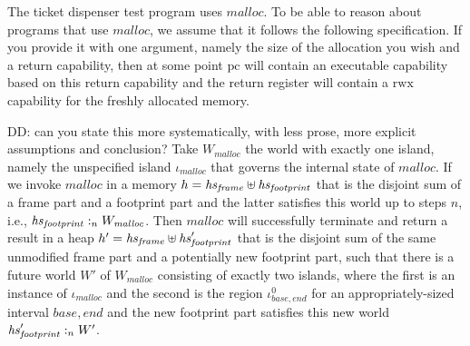 \documentclass{article}
\newcommand\lau[1]{{\color{purple} \sf \footnotesize {LS: #1}}}
\newcommand\dominique[1]{{\color{purple} \sf \footnotesize {DD: #1}}}
\newcommand{\var}[1]{\mathit{#1}}
\newcommand{\pcreg}{\mathrm{pc}}
\newcommand{\heap}{\var{heap}}
\newcommand{\heapSat}[3][\heap]{#1 :_{#2} #3}
\newcommand{\codelabel}[1]{\mathit{#1}}
\newcommand{\malloc}{\codelabel{malloc}}
\newcommand{\plainperm}[1]{\mathrm{#1}}
\newcommand{\rwx}{\plainperm{rwx}}
\begin{document}
The ticket dispenser test program uses $\malloc$. To be able to reason about programs that use $\malloc$, we assume that it follows the following specification. If you provide it with one argument, namely the size of the allocation you wish and a return capability, then at some point $\pcreg$ will contain an executable capability based on this return capability and the return register will contain a $\rwx$ capability for the freshly allocated memory. 
\begin{specification}[Malloc]\dominique{can you state this more systematically, with less prose, more explicit assumptions and conclusion?}
Take $W_{\malloc}$ the world with exactly one island, namely the unspecified island $\iota_{\malloc}$ that governs the internal state of $\malloc$.  If we invoke $\malloc$ in a memory $h = \hsframe \uplus \hsfoot$
that is the disjoint sum of a frame part and a footprint part and the latter satisfies this world up to steps $n$, i.e., $\heapSat[\hsfoot]{n}{W_{\malloc}}$. Then $\malloc$ will successfully terminate and return a result in a heap $h' = \hsframe \uplus \hsfoot'$ that is the disjoint sum of the same unmodified frame part and a potentially new footprint part, such that there is a future world $W'$ of $W_{\malloc}$ consisting of exactly two islands, where the first is an instance of $\iota_{\malloc}$ and the second is the region $\iota_{\var{base},\var{end}}^0$
 for an appropriately-sized interval $\var{base},\var{end}$ and the new footprint part satisfies this new world $\heapSat[\hsfoot']{n}{W'}$. 


\end{specification}
\end{document}
